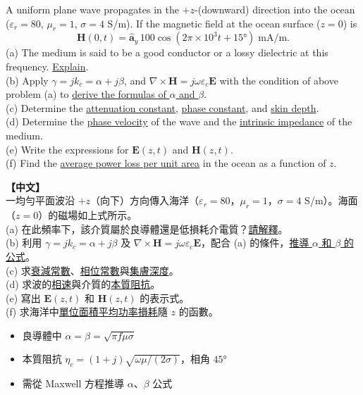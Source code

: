 \documentclass[12pt,a4paper]{article}
\newcommand{\vE}{\mathbf{E}}
\newcommand{\vH}{\mathbf{H}}
\newcommand{\ay}{\hat{\mathbf{a}}_y}
\begin{document}
\begin{questionbox}
A uniform plane wave propagates in the $+z$-(downward) direction into the ocean ($\varepsilon_r = 80$, $\mu_r = 1$, $\sigma = 4$ S/m). If the magnetic field at the ocean surface ($z = 0$) is
\[
  \vH(0,t) = \ay\,100\cos(2\pi\times10^3 t + 15°) \;\text{mA/m}.
\]
(a) The medium is said to be a good conductor or a lossy dielectric at this frequency. \underline{Explain}.\\
(b) Apply $\gamma = jk_c = \alpha + j\beta$, and $\nabla\times\vH = j\omega\varepsilon_c\vE$ with the condition of above problem (a) to \underline{derive the formulas of $\alpha$ and $\beta$}.\\
(c) Determine the \underline{attenuation constant}, \underline{phase constant}, and \underline{skin depth}.\\
(d) Determine the \underline{phase velocity} of the wave and the \underline{intrinsic impedance} of the medium.\\
(e) Write the expressions for $\vE(z,t)$ and $\vH(z,t)$.\\
(f) Find the \underline{average power loss per unit area} in the ocean as a function of $z$.

\medskip\noindent\textbf{【中文】}\\
一均勻平面波沿 $+z$（向下）方向傳入海洋（$\varepsilon_r = 80$，$\mu_r = 1$，$\sigma = 4$ S/m）。海面（$z=0$）的磁場如上式所示。\\
(a) 在此頻率下，該介質屬於良導體還是低損耗介電質？\underline{請解釋}。\\
(b) 利用 $\gamma = jk_c = \alpha + j\beta$ 及 $\nabla\times\vH = j\omega\varepsilon_c\vE$，配合 (a) 的條件，\underline{推導 $\alpha$ 和 $\beta$ 的公式}。\\
(c) 求\underline{衰減常數}、\underline{相位常數}與\underline{集膚深度}。\\
(d) 求波的\underline{相速}與介質的\underline{本質阻抗}。\\
(e) 寫出 $\vE(z,t)$ 和 $\vH(z,t)$ 的表示式。\\
(f) 求海洋中\underline{單位面積平均功率損耗}隨 $z$ 的函數。
\end{questionbox}

\begin{conceptbox}[核心概念]
\begin{itemize}
  \item 良導體中 $\alpha = \beta = \sqrt{\pi f\mu\sigma}$
  \item 本質阻抗 $\eta_c = (1+j)\sqrt{\omega\mu/(2\sigma)}$，相角 $45°$
  \item 需從 Maxwell 方程推導 $\alpha$、$\beta$ 公式
\end{itemize}
\end{conceptbox}
\end{document}
